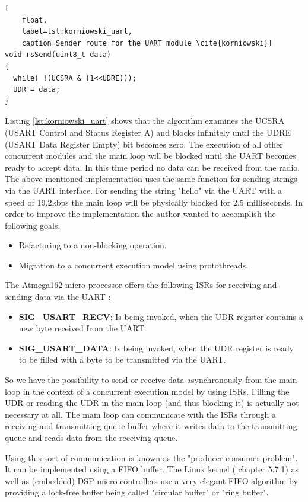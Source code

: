 \begin{lstlisting}[
	float,
	label=lst:korniowski_uart,
	caption=Sender route for the UART module \cite{korniowski}]
void rsSend(uint8_t data)
{
  while( !(UCSRA & (1<<UDRE)));
  UDR = data;
}
\end{lstlisting}

Listing \ref{lst:korniowski_uart} shows that the algorithm examines the UCSRA (USART Control and Status Register A) and blocks infinitely until the UDRE (USART Data Register Empty) bit becomes zero. The execution of all other concurrent modules and the main loop will be blocked until the UART becomes ready to accept data. In this time period no data can be received from the radio. The above mentioned implementation uses the same function for sending strings via the UART interface. For sending the string "hello" via the UART with a speed of 19.2kbps the main loop will be physically blocked for 2.5 milliseconds. In order to improve the implementation the author wanted to accomplish the following goals:

\begin{itemize}
    \item Refactoring to a non-blocking operation.
    \item Migration to a concurrent execution model using protothreads.
\end{itemize}

The Atmega162 micro-processor offers the following ISRs for receiving and sending data via the UART \cite{atmega162datasheet}:

\begin{itemize}
    \item \textbf{SIG\_USART\_RECV}: Is being invoked, when the UDR register contains a new byte received from the UART.
    \item \textbf{SIG\_USART\_DATA}: Is being invoked, when the UDR register is ready to be filled with a byte to be transmitted via the UART.
\end{itemize}

So we have the possibility to send or receive data asynchronously from the main loop in the context of a concurrent execution model by using ISRs. Filling the UDR or reading the UDR in the main loop (and thus blocking it) is actually not necessary at all. The main loop can communicate with the ISRs through a receiving and transmitting queue buffer where it writes data to the transmitting queue and reads data from the receiving queue.

Using this sort of communication is known as the "producer-consumer problem". It can be implemented using a FIFO buffer. The Linux kernel (\cite{linux_device_drivers} chapter 5.7.1) as well as (embedded) DSP micro-controllers \cite{ti_dsp} use a very elegant FIFO-algorithm by providing a lock-free buffer being called "circular buffer" or "ring buffer".

